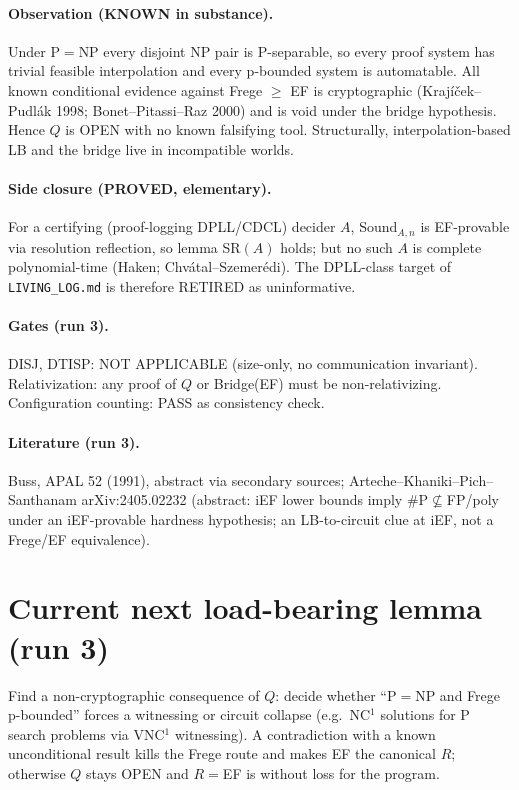\documentclass[11pt]{article}
\begin{document}
\paragraph{Observation (KNOWN in substance).} Under P$=$NP every disjoint NP pair is
P-separable, so every proof system has trivial feasible interpolation and every p-bounded
system is automatable. All known conditional evidence against Frege $\ge$ EF is
cryptographic (Kraj\'i\v{c}ek--Pudl\'ak 1998; Bonet--Pitassi--Raz 2000) and is void under the
bridge hypothesis. Hence $Q$ is OPEN with no known falsifying tool. Structurally,
interpolation-based LB and the bridge live in incompatible worlds.

\paragraph{Side closure (PROVED, elementary).} For a certifying (proof-logging DPLL/CDCL)
decider $A$, Sound$_{A,n}$ is EF-provable via resolution reflection, so lemma SR$(A)$ holds;
but no such $A$ is complete polynomial-time (Haken; Chv\'atal--Szemer\'edi). The DPLL-class
target of \texttt{LIVING\_LOG.md} is therefore RETIRED as uninformative.

\paragraph{Gates (run 3).} DISJ, DTISP: NOT APPLICABLE (size-only, no communication
invariant). Relativization: any proof of $Q$ or Bridge(EF) must be non-relativizing.
Configuration counting: PASS as consistency check.

\paragraph{Literature (run 3).} Buss, APAL 52 (1991), abstract via secondary sources;
Arteche--Khaniki--Pich--Santhanam arXiv:2405.02232 (abstract: iEF lower bounds imply
$\#$P$\not\subseteq$FP/poly under an iEF-provable hardness hypothesis; an LB-to-circuit clue at
iEF, not a Frege/EF equivalence).

\section{Current next load-bearing lemma (run 3)}
Find a non-cryptographic consequence of $Q$: decide whether ``P$=$NP and Frege p-bounded''
forces a witnessing or circuit collapse (e.g.\ NC$^1$ solutions for P search problems via
VNC$^1$ witnessing). A contradiction with a known unconditional result kills the Frege route and
makes EF the canonical $R$; otherwise $Q$ stays OPEN and $R=$EF is without loss for the program.
\end{document}
